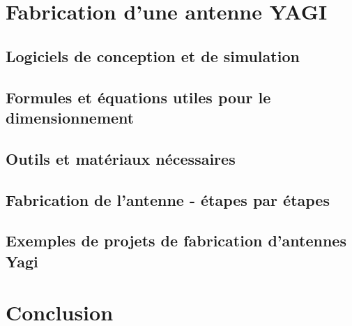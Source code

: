 \documentclass[12pt, a4paper]{article}
\begin{document}
\section{Fabrication d'une antenne YAGI}
\subsection{Logiciels de conception et de simulation}

\subsection{Formules et équations utiles pour le dimensionnement}

\subsection{Outils et matériaux nécessaires}

\subsection{Fabrication de l'antenne - étapes par étapes}

\subsection{Exemples de projets de fabrication d'antennes Yagi}






\section{Conclusion}



\end{document}
